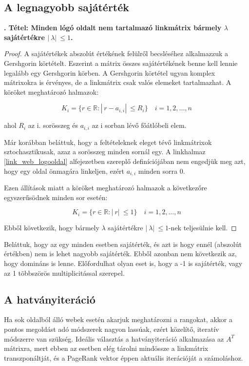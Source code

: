 \documentclass[12pt,a4paper]{article}
\newcounter{tszam}
\newenvironment{tetel}[1]
{{\medskip}\noindent \stepcounter{tszam}
{\bfseries{\thetszam. Tétel: #1\\[1ex]}}}{\bigskip }
\begin{document}
\subsection{A legnagyobb sajátérték}\label{legnagyobb_sajatertek}

\begin{tetel}{Minden lógó oldalt nem tartalmazó linkmátrix bármely $\lambda$ sajátértékre $ |\ \lambda |\ \leq 1$.}
\end{tetel}
\vspace{-1cm}
\begin{proof}
	A sajátértékek abszolút értékének felülről becsléséhez alkalmazzuk a Gershgorin körtételt. Eszerint a mátrix összes sajátértékének benne kell lennie legalább egy Gershgorin körben. A Gershgorin körtétel ugyan komplex mátrixokra is érvényes, de a linkmátrix csak valós elemeket tartalmazhat. A köröket meghatározó halmazok: 
	
	\[ K_i = \{ r \in \mathbb{R}: |\ r - a_{i,i} |\ \leq R_i \} \quad i = 1,2,...,n \]
	
	ahol $R_i$ az i. sorösszeg és $a_{i,i}$ az i sorban lévő főátlóbeli elem.
	
	Már korábban beláttuk, hogy a feltételeknek eleget tévő linkmátrixok sztochasztikusak, azaz a sorösszeg minden sornál egy. A linkhalmaz \ref{link_web_logooldal} alfejezetben szereplő definíciójában nem engedjük meg azt, hogy egy oldal önmagára linkeljen, ezért $a_{i,i}$ minden sorra 0.
	
	Ezen állítások miatt a köröket meghatározó halmazok a következőre egyszerűsödnek minden sor esetén:
	
	\[ K_i = \{ r \in \mathbb{R}: |\ r |\ \leq 1 \} \quad i = 1,2,...,n \]
	
	Ebből következik, hogy bármely $\lambda$ sajátértékre $ |\ \lambda |\ \leq 1$-nek teljesülnie kell.
\end{proof}

Beláttuk, hogy az egy minden esetben sajátérték, és azt is hogy ennél (abszolút értékben) nem is lehet nagyobb sajátérték. Ebből azonban nem következik az, hogy domináns is lenne. Előfordulhat olyan eset is, hogy a -1 is sajátérték, vagy az 1 többszörös multiplicitással szerepel.

\subsection{A hatványiteráció}

Ha sok oldalból álló webek esetén akarjuk meghatározni a rangokat, akkor a pontos megoldást adó módszerek nagyon lassúak, ezért közelítő, iteratív módszerre van szükség. Ideális választás a hatványiteráció alkalmazása az $A^T$ mátrixra, mert ebben az esetben elég tárolni mindössze a linkmátrix transzponáltját, és a PageRank vektor éppen aktuális iterációját a számoláshoz.
\end{document}
